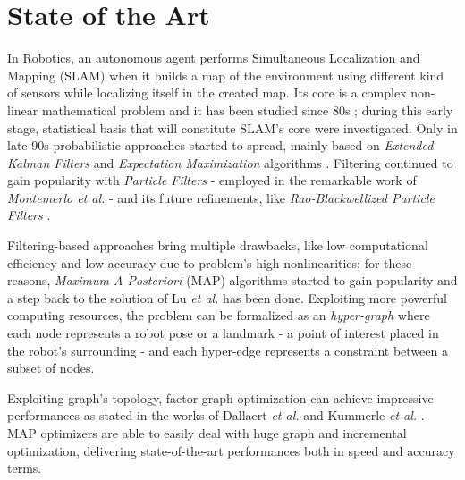 \documentclass[10pt,a4paper, notitlepage]{report}
\begin{document}
\section*{State of the Art}
In Robotics, an autonomous agent performs Simultaneous Localization and Mapping (SLAM) when it builds a map of the environment using different kind of sensors while localizing itself in the created map. Its core is a complex non-linear mathematical problem and it has been studied since 80s \cite{durrant2006simultaneous} \cite{bailey2006simultaneous}; during this early stage, statistical basis that will constitute SLAM's core were investigated. Only in late 90s probabilistic approaches started to spread, mainly based on \textit{Extended Kalman Filters} \cite{leonard1990dynamic} \cite{dissanayake2001solution} and \textit{Expectation Maximization} algorithms \cite{dellaert2003mcmc} \cite{thrun2001probabilistic}. Filtering continued to gain popularity with \textit{Particle Filters} - employed in the remarkable work of \textit{Montemerlo et al.} \cite{montemerlo2002fastslam} - and its future refinements, like \textit{Rao-Blackwellized Particle Filters} \cite{grisetti2005improving} \cite{carlone2010rao} \cite{tipaldi2007heterogeneous}.

Filtering-based approaches bring multiple drawbacks, like low computational efficiency and low accuracy due to problem's high nonlinearities; for these reasons, \textit{Maximum A Posteriori} (MAP) algorithms started to gain popularity and a step back to the solution of Lu \textit{et al.} \cite{lu1997globally} has been done. Exploiting more powerful computing resources, the problem can be formalized as an \textit{hyper-graph} where each node represents a robot pose or a landmark - a point of interest placed in the robot's surrounding - and each hyper-edge represents a constraint between a subset of nodes. 

Exploiting graph's topology, factor-graph optimization can achieve impressive performances as stated in the works of Dallaert \textit{et al.} \cite{dellaert2006square} and Kummerle \textit{et al.}  \cite{kummerle2011g}. MAP optimizers \cite{kummerle2011g} \cite{dellaert2012gtsam} \cite{ceres-solver} \cite{kaess2012isam2} are able to easily deal with huge graph and incremental optimization, delivering state-of-the-art performances both in speed and accuracy terms.
\end{document}
